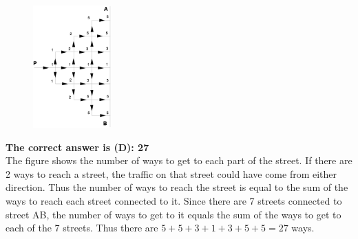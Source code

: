 \documentclass{article}
\begin{document}
\begin{figure}
	\includegraphics[width=30mm,viewport=89 22 487 642]{CCJPR73-25pic2.eps}
\end{figure}

\textbf{The correct answer is (D): 27}\\[1 ex]
The figure shows the number of ways to get to each part of the street. If there are 2 ways to reach a street, the traffic on that street could have come from either direction. Thus the number of ways to reach the street is equal to the sum of the ways to reach each street connected to it. Since there are 7 streets connected to street AB, the number of ways to get to it equals the sum of the ways to get to each of the 7 streets.  Thus there are $5+5+3+1+3+5+5=27$ ways.
\end{document}

